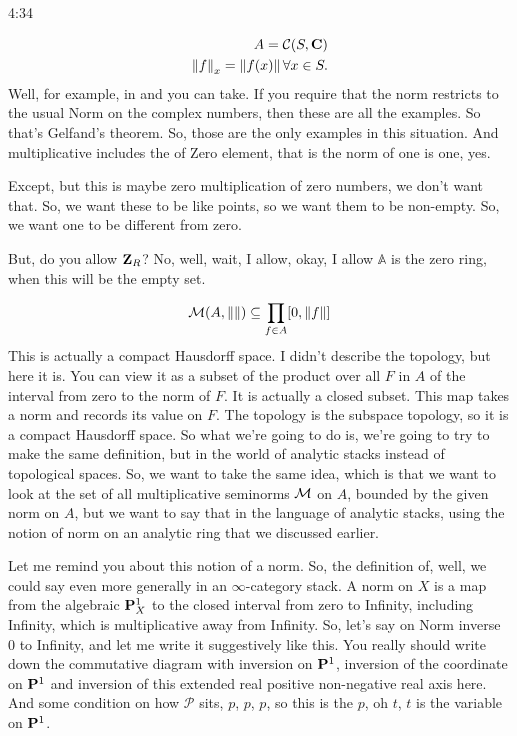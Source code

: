 \begin{unfinished}{4:34}
\begin{example}
\begin{example}
\begin{example} 
\begin{align*}
A = \Cont(S, \C) \\
\norm{f}_x = \norm{f(x)} \forall x \in S.
\end{align*}
Well, for example, in and you can take. If you require that the norm restricts to the usual Norm on the complex numbers, then these are all the examples. So that's  Gelfand's theorem. So, those are the only examples in this situation. And multiplicative includes the of Zero element, that is the norm of one is one, yes.

Except, but this is maybe zero multiplication of zero numbers, we don't want that. So, we want these to be like points, so we want them to be non-empty. So, we want one to be different from zero.

But, do you allow $\Z_R$? No, well, wait, I allow, okay, I allow $\mathbb{A}$ is the zero ring, when this will be the empty set.

\begin{align}
\BerkSpec(A, \norm{}) \subseteq \prod_{f \in A} [0, \norm{f} ]
\end{align}
This is actually a compact Hausdorff space. I didn't describe the topology, but here it is. You can view it as a subset of the product over all $F$ in $A$ of the interval from zero to the norm of $F$. It is actually a closed subset. This map takes a norm and records its value on $F$. The topology is the subspace topology, so it is a compact Hausdorff space.
So what we're going to do is, we're going to try to make the same definition, but in the world of analytic stacks instead of topological spaces. So, we want to take the same idea, which is that we want to look at the set of all multiplicative seminorms $\BerkSpec$ on $A$, bounded by the given norm on $A$, but we want to say that in the language of analytic stacks, using the notion of norm on an analytic ring that we discussed earlier.

Let me remind you about this notion of a norm. So, the definition of, well, we could say even more generally in an $\infty$-category stack. A norm on $X$ is a map from the algebraic $\P^1_X$ to the closed interval from zero to Infinity, including Infinity, which is multiplicative away from Infinity. So, let's say on Norm inverse $0$ to Infinity, and let me write it suggestively like this. You really should write down the commutative diagram with inversion on $\P^1$, inversion of the coordinate on $\P^1$ and inversion of this extended real positive non-negative real axis here. And some condition on how $\mathcal{P}$ sits, $p$, $p$, $p$, so this is the $p$, oh $t$, $t$ is the variable on $\P^1$.


\end{example}
\end{example}
\end{example}
\end{unfinished}
